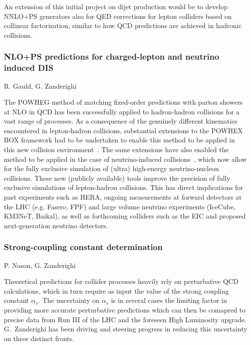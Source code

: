 \documentclass{FBR_Bericht_2025}
\begin{document}
\begin{refsection}
An extension of this initial project on dijet production would be to develop NNLO+PS generators
also for QED corrections for lepton colliders based on collinear factorization, similar to how 
QCD predictions are achieved in hadronic collisions.

\subsubsection{NLO+PS predictions for charged-lepton and neutrino induced DIS}
\begin{Namen}
R. Gauld, G. Zanderighi
\end{Namen}
The POWHEG method of matching fixed-order predictions with parton showers at NLO in QCD has been successfully applied to hadron-hadron collisions for a vast range of processes. As a consequence of the genuinely different kinematics encountered in lepton-hadron collisions, substantial extensions to the POWHEX BOX framework had to be undertaken to enable this method to be applied in this new collision environment~\cite{Banfi:2023mhz}.
The same extensions have also enabled the method to be applied in the case of neutrino-induced collisions~\cite{FerrarioRavasio:2024kem}, which now allow for the fully exclusive simulation of (ultra) high-energy neutrino-nucleon collisions.
These new (publicly available) tools improve the precision of fully exclusive simulations of lepton-hadron collisions. This has direct implications for past experiments such as HERA, ongoing measurements at forward detectors at the LHC (e.g. Faser$\nu$, FPF) and large volume neutrino experiments (IceCube, KM3NeT, Baikal), as well as forthcoming colliders such as the EIC and proposed next-generation neutrino detectors.
%
\subsubsection{Strong-coupling constant determination}
\begin{Namen}
P. Nason, G. Zanderighi
\end{Namen}
%
Theoretical predictions for collider processes heavily rely on
perturbative QCD calculations, which in turn require as input the
value of the strong coupling constant $\alpha_s$. The uncertainty on
$\alpha_s$ is in several cases the limiting factor in providing more
accurate perturbative predictions which can then be comapred to
precise data from Run III of the LHC and the foreseen High Luminosity
upgrade.
%
G.~Zanderighi has been driving and steering progress in reducing this
uncertainty on three distinct fronts.


\end{refsection}
\end{document}
